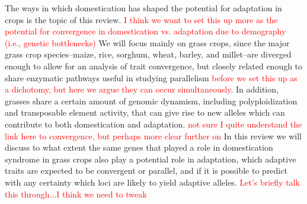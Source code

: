 \documentclass[12pt]{article}
\newcommand{\mbh}[1]{\textcolor{red}{\normalsize  #1}}
\begin{document}
The ways in which domestication has shaped the potential for adaptation in crops is the topic of this review. \mbh{I think we want to set this up more as the potential for convergence in domestication vs. adaptation due to demography (i.e., genetic bottlenecks)}
We will focus mainly on grass crops, since the major grass crop species--maize, rice, sorghum, wheat, barley, and millet--are diverged enough to allow for an analysis of trait convergence, but closely related enough to share enzymatic pathways useful in studying parallelism \mbh{before we set this up as a dichotomy, but here we argue they can occur simultaneously}.
In addition, grasses share a certain amount of genomic dynamism, including polyploidization and transposable element activity, that can give rise to new alleles which can contribute to both domestication and adaptation. \mbh{not sure I quite understand the link here to convergence, but perhaps more clear further on}
In this review we will discuss to what extent the same genes that played a role in domestication syndrome in grass crops also play a potential role in adaptation, which adaptive traits are expected to be convergent or parallel, and if it is possible to predict with any certainty which loci are likely to yield adaptive alleles.
\mbh{Let's briefly talk this through...I think we need to tweak}
\paragraph{}
\end{document}
